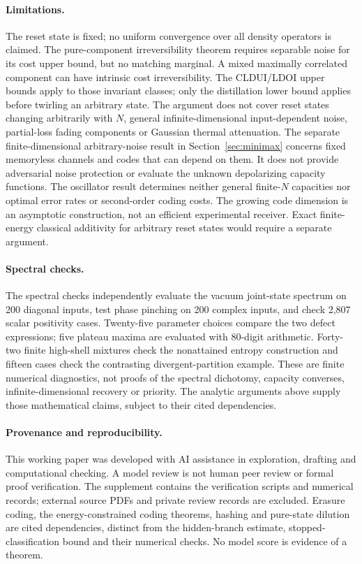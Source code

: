 \documentclass[11pt]{article}
\begin{document}
\paragraph{Limitations.}
The reset state is fixed; no uniform convergence over all density
operators is claimed. The pure-component irreversibility theorem requires separable noise
for its cost upper bound, but no matching marginal. A mixed maximally
correlated component can have intrinsic cost irreversibility. The
CLDUI/LDOI upper bounds apply to those invariant classes; only the
distillation lower bound applies before twirling an arbitrary state.
The argument does not cover reset states changing arbitrarily with $N$,
general infinite-dimensional input-dependent noise, partial-loss fading
components or Gaussian thermal attenuation. The separate finite-dimensional
arbitrary-noise result in Section~\ref{sec:minimax} concerns fixed memoryless
channels and codes that can depend on them. It does not provide adversarial
noise protection or evaluate the unknown depolarizing capacity functions.
The oscillator result determines neither general finite-$N$ capacities nor optimal error
rates or second-order coding costs. The growing code dimension is an
asymptotic construction, not an efficient experimental receiver.
Exact finite-energy classical additivity for arbitrary reset states
would require a separate argument.

\paragraph{Spectral checks.}
The spectral checks independently evaluate the vacuum joint-state
spectrum on 200 diagonal inputs, test phase pinching on 200 complex
inputs, and check 2,807 scalar positivity cases. Twenty-five parameter
choices compare the two defect expressions; five plateau maxima are
evaluated with 80-digit arithmetic. Forty-two finite high-shell mixtures
check the nonattained entropy construction and fifteen cases check
the contrasting divergent-partition example. These are finite numerical
diagnostics, not proofs of the spectral dichotomy, capacity converses,
infinite-dimensional recovery or priority. The analytic arguments above
supply those mathematical claims, subject to their cited dependencies.

\paragraph{Provenance and reproducibility.}
This working paper was developed with AI assistance in exploration,
drafting and computational checking. A model review is not human peer
review or formal proof verification. The supplement contains the
verification scripts and numerical records; external source PDFs and
private review records are excluded. Erasure coding, the energy-constrained
coding theorems, hashing and pure-state dilution are cited dependencies,
distinct from the hidden-branch estimate, stopped-classification bound
and their numerical checks. No model score is evidence of a theorem.
\end{document}
